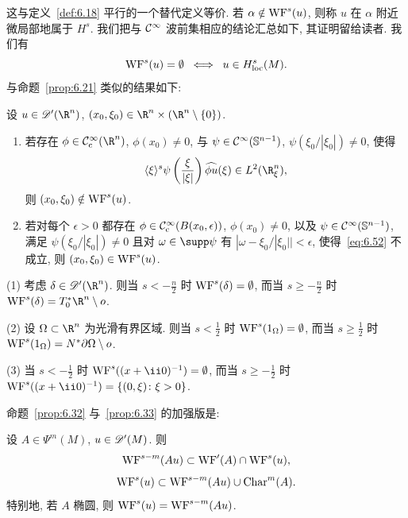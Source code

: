 这与定义~\ref{def:6.18} 平行的一个替代定义等价. 若 $\alpha \notin \operatorname{WF}^s(u)$, 则称 $u$ 在 $\alpha$ 附近微局部地属于 $H^s$. 我们把与 $\mathcal{C}^\infty$ 波前集相应的结论汇总如下, 其证明留给读者. 我们有
\begin{equation}\label{eq:6.51}
    \operatorname{WF}^s(u) = \emptyset \;\; \Longleftrightarrow \;\; u \in H^s_{\mathrm{loc}}(M).
\end{equation}
与命题~\ref{prop:6.21} 类似的结果如下:

\begin{proposition}\label{prop:6.36}
设 $u \in \Distr(\R^n)$, $(x_0, \xi_0) \in \R^n \times (\R^n \setminus \{0\})$.
\begin{enumerate}
    \item 若存在 $\phi \in \SmoothComp(\R^n)$, $\phi(x_0) \neq 0$, 与 $\psi \in \mathcal{C}^\infty(\mathbb{S}^{n-1})$, $\psi(\xi_0/|\xi_0|) \neq 0$, 使得
    \begin{equation}\label{eq:6.52}
        \langle \xi \rangle^s \psi\left( \frac{\xi}{|\xi|} \right) \widehat{\phi u}(\xi) \in L^2(\R^n_\xi),
    \end{equation}
    则 $(x_0, \xi_0) \notin \operatorname{WF}^s(u)$.
    \item 若对每个 $\epsilon > 0$ 都存在 $\phi \in \mathcal{C}_{\mathrm{c}}^\infty(B(x_0, \epsilon))$, $\phi(x_0) \neq 0$, 以及 $\psi \in \mathcal{C}^\infty(\mathbb{S}^{n-1})$, 满足 $\psi(\xi_0/|\xi_0|) \neq 0$ 且对 $\omega \in \supp \psi$ 有 $|\omega - \xi_0/|\xi_0|| < \epsilon$, 使得~\eqref{eq:6.52} 不成立, 则 $(x_0, \xi_0) \in \operatorname{WF}^s(u)$.
\end{enumerate}
\end{proposition}

\begin{example}\label{eg:6.37}
(1) 考虑 $\delta \in \Distr(\R^n)$. 则当 $s < -\tfrac{n}{2}$ 时 $\operatorname{WF}^s(\delta) = \emptyset$, 而当 $s \ge -\tfrac{n}{2}$ 时 $\WF^s(\delta) = T^*_0 \R^n \setminus o$.

(2) 设 $\Omega \subset \R^n$ 为光滑有界区域. 则当 $s < \tfrac{1}{2}$ 时 $\operatorname{WF}^s(1_\Omega) = \emptyset$, 而当 $s \ge \tfrac{1}{2}$ 时 $\operatorname{WF}^s(1_\Omega) = N^* \partial\Omega \setminus o$.

(3) 当 $s < -\tfrac{1}{2}$ 时 $\WF^s((x + \ii 0)^{-1}) = \emptyset$, 而当 $s \ge -\tfrac{1}{2}$ 时 $\WF^s((x + \ii 0)^{-1}) = \{(0, \xi) \colon \xi > 0\}$.
\end{example}

命题~\ref{prop:6.32} 与~\ref{prop:6.33} 的加强版是:

\begin{proposition}[微局部性与微局部椭圆正则性: $H^s$ 版本]\label{prop:6.38}
设 $A \in \Psi^m(M)$, $u \in \mathscr{D}'(M)$. 则
\begin{equation}\label{eq:6.53}
    \operatorname{WF}^{s-m}(A u) \subset \operatorname{WF}'(A) \cap \operatorname{WF}^s(u),
\end{equation}
\begin{equation}\label{eq:6.54}
    \operatorname{WF}^s(u) \subset \operatorname{WF}^{s-m}(A u) \cup \operatorname{Char}^m(A).
\end{equation}
特别地, 若 $A$ 椭圆, 则 $\operatorname{WF}^s(u) = \operatorname{WF}^{s-m}(A u)$.
\end{proposition}

